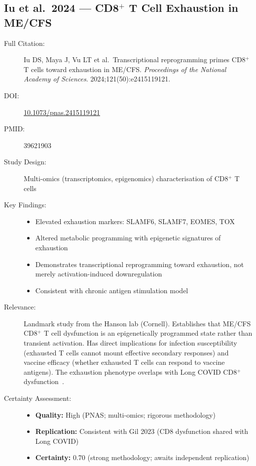 \subsection{Iu et al.\ 2024 --- CD8$^+$ T Cell Exhaustion in ME/CFS}

\begin{description}
    \item[Full Citation:] Iu DS, Maya J, Vu LT et al.\ Transcriptional reprogramming primes CD8$^+$ T cells toward exhaustion in ME/CFS. \textit{Proceedings of the National Academy of Sciences}. 2024;121(50):e2415119121.
    \item[DOI:] \href{https://doi.org/10.1073/pnas.2415119121}{10.1073/pnas.2415119121}
    \item[PMID:] 39621903
    \item[Study Design:] Multi-omics (transcriptomics, epigenomics) characterisation of CD8$^+$ T cells
    \item[Key Findings:]
    \begin{itemize}
        \item Elevated exhaustion markers: SLAMF6, SLAMF7, EOMES, TOX
        \item Altered metabolic programming with epigenetic signatures of exhaustion
        \item Demonstrates transcriptional reprogramming toward exhaustion, not merely activation-induced downregulation
        \item Consistent with chronic antigen stimulation model
    \end{itemize}
    \item[Relevance:] Landmark study from the Hanson lab (Cornell). Establishes that ME/CFS CD8$^+$ T cell dysfunction is an epigenetically programmed state rather than transient activation. Has direct implications for infection susceptibility (exhausted T cells cannot mount effective secondary responses) and vaccine efficacy (whether exhausted T cells can respond to vaccine antigens). The exhaustion phenotype overlaps with Long COVID CD8$^+$ dysfunction~\cite{Gil2023cd8}.
    \item[Certainty Assessment:]
    \begin{itemize}
        \item \textbf{Quality:} High (PNAS; multi-omics; rigorous methodology)
        \item \textbf{Replication:} Consistent with Gil 2023 (CD8 dysfunction shared with Long COVID)
        \item \textbf{Certainty:} 0.70 (strong methodology; awaits independent replication)
    \end{itemize}
\end{description}

